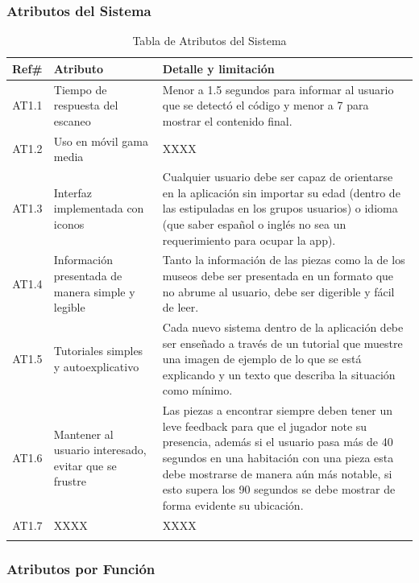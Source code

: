 \subsubsection{Atributos del Sistema}

\begin{longtable}{|c|p{3.5cm}|p{10cm}|}
\hline 
Ref\# & Atributo & Detalle y limitación \\ 
\hline 
AT1.1 & Tiempo de respuesta del escaneo & Menor a 1.5 segundos para informar al usuario que se detectó el código y menor a 7 para mostrar el contenido final.  \\ 
\hline 
AT1.2 & Uso en móvil gama media & XXXX  \\ 
\hline
AT1.3 & Interfaz implementada con iconos & Cualquier usuario debe ser capaz de orientarse en la aplicación sin importar su edad (dentro de las estipuladas en los grupos usuarios) o idioma (que saber español o inglés no sea un requerimiento para ocupar la app).  \\ 
\hline
AT1.4 & Información presentada de manera simple y legible & Tanto la información de las piezas como la de los museos debe ser presentada en un formato que no abrume al usuario, debe ser digerible y fácil de leer.  \\ 
\hline
AT1.5 & Tutoriales simples y autoexplicativo & Cada nuevo sistema dentro de la aplicación debe ser enseñado a través de un tutorial que muestre una imagen de ejemplo de lo que se está explicando y un texto que describa la situación como mínimo.	\\ 
\hline
AT1.6 & Mantener al usuario interesado, evitar que se frustre & Las piezas a encontrar  siempre deben tener un leve feedback para que el jugador note su presencia, además si el usuario pasa más de 40 segundos en una habitación con una pieza esta debe mostrarse de manera aún más notable, si esto supera los 90 segundos se debe mostrar de forma evidente su ubicación.  \\ 
\hline
AT1.7 & XXXX & XXXX  \\ 
\hline
\caption{Tabla de Atributos del Sistema}
\label{tab19}\\
\end{longtable}

\subsubsection{Atributos por Función}

